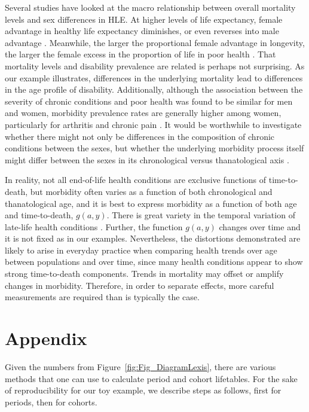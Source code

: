 \documentclass[11pt,oneside,a4paper]{article} %
\begin{document}
Several studies have looked at the macro relationship between overall mortality levels and sex differences in HLE. At higher levels of life expectancy, female advantage in healthy life expectancy diminishes, or even reverses into male advantage \citep{vanOyen2013}. Meanwhile, the larger the proportional female advantage in longevity, the larger the female excess in the proportion of life in poor health \citep{Luy2014}. That mortality levels and disability prevalence are related is perhaps not surprising. As our example illustrates, differences in the underlying mortality lead to differences in the age profile of disability. Additionally, although the association between the severity of chronic conditions and poor health was found to be similar for men and women, morbidity prevalence rates are generally higher among women, particularly for arthritis and chronic pain \citep{Case2005}. It would be worthwhile to investigate whether there might not only be differences in the composition of chronic conditions between the sexes, but whether the underlying morbidity process itself might differ between the sexes in its chronological versus thanatological axis \citep{Riffe2015}. 

In reality, not all end-of-life health conditions are exclusive functions of
time-to-death, but morbidity often varies as a function of
both chronological and thanatological age, and it is best to express morbidity
as a function of both age and time-to-death, $g(a,y)$. There is great variety in
the temporal variation of late-life health conditions \citep{Riffe2015}.
Further, the function $g(a,y)$ changes over time and it is not fixed as in our examples. Nevertheless, the distortions demonstrated are likely to arise in everyday practice when comparing health trends over age between populations
and over time, since many health conditions appear to show strong time-to-death
components. Trends in mortality may offset or amplify changes in morbidity.
Therefore, in order to separate effects, more careful measurements are required
than is typically the case. 

\section{Appendix}

Given the numbers from Figure~\ref{fig:Fig_DiagramLexis}, there are various methods that one can use to
calculate period and cohort lifetables. For the sake of reproducibility for our
toy example, we describe steps as follows, first for periods, then for cohorts.
\end{document}
